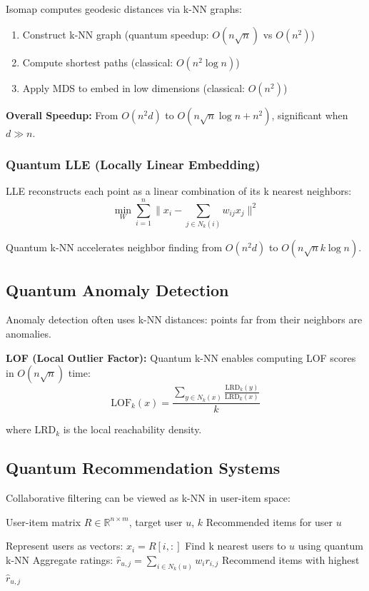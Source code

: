 \documentclass[11pt]{article}
\begin{document}
Isomap computes geodesic distances via k-NN graphs:
\begin{enumerate}
    \item Construct k-NN graph (quantum speedup: $O(n\sqrt{n})$ vs $O(n^2)$)
    \item Compute shortest paths (classical: $O(n^2 \log n)$)
    \item Apply MDS to embed in low dimensions (classical: $O(n^2)$)
\end{enumerate}

\textbf{Overall Speedup:} From $O(n^2d)$ to $O(n\sqrt{n} \log n + n^2)$, significant when $d \gg n$.

\subsubsection{Quantum LLE (Locally Linear Embedding)}

LLE reconstructs each point as a linear combination of its k nearest neighbors:
\begin{equation}
\min_W \sum_{i=1}^n \|x_i - \sum_{j \in N_k(i)} w_{ij} x_j\|^2
\end{equation}

Quantum k-NN accelerates neighbor finding from $O(n^2d)$ to $O(n\sqrt{n}k\log n)$.

\subsection{Quantum Anomaly Detection}

Anomaly detection often uses k-NN distances: points far from their neighbors are anomalies.

\textbf{LOF (Local Outlier Factor):} Quantum k-NN enables computing LOF scores in $O(n\sqrt{n})$ time:
\begin{equation}
\text{LOF}_k(x) = \frac{\sum_{y \in N_k(x)} \frac{\text{LRD}_k(y)}{\text{LRD}_k(x)}}{k}
\end{equation}

where $\text{LRD}_k$ is the local reachability density.

\subsection{Quantum Recommendation Systems}

Collaborative filtering can be viewed as k-NN in user-item space:

\begin{algorithm}
\caption{Quantum Collaborative Filtering}
\begin{algorithmic}[1]
\REQUIRE User-item matrix $R \in \mathbb{R}^{n \times m}$, target user $u$, $k$
\ENSURE Recommended items for user $u$

\STATE Represent users as vectors: $x_i = R[i, :]$
\STATE Find k nearest users to $u$ using quantum k-NN
\STATE Aggregate ratings: $\hat{r}_{u,j} = \sum_{i \in N_k(u)} w_i r_{i,j}$
\STATE Recommend items with highest $\hat{r}_{u,j}$
\end{algorithmic}
\end{algorithm}
\end{document}

